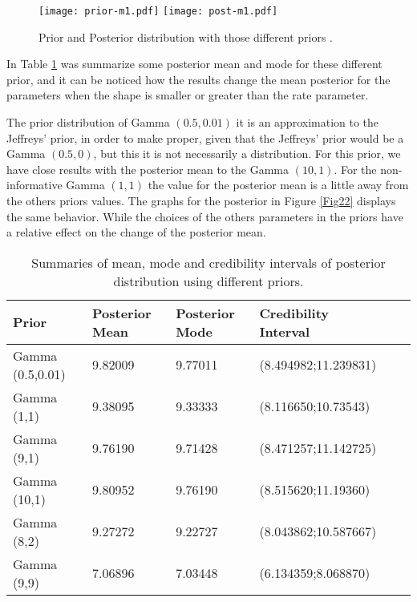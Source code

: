 \documentclass[a4paper, 11pt]{article}
\begin{document}
\begin{figure}[H]
\centering
\texttt{[image: prior-m1.pdf]}
\texttt{[image: post-m1.pdf]}
\caption{Prior and Posterior distribution with those different priors .}
\label{Fig2}
\end{figure}

 In Table \ref{prior1} was summarize some posterior mean and mode for these different prior, and it can be noticed how the results change the mean posterior for the parameters when the shape is smaller or greater than the rate parameter. 

The prior distribution of Gamma $(0.5,0.01)$ it is an approximation to the Jeffreys' prior, in order to make proper, given that the Jeffreys' prior would be a Gamma $(0.5,0)$, but this it is not necessarily a distribution. For this prior, we have close results with the posterior mean to the Gamma $(10,1)$. For the non-informative Gamma $(1,1)$ the value for the posterior mean is a little away from the others priors values. The graphs for the posterior in Figure \ref{Fig22} displays the same behavior. While the choices of the others parameters in the priors have a relative effect on the change of the posterior mean.
 
\begin{table}[H]
\caption{Summaries of mean, mode and credibility intervals of posterior distribution using different priors.}\label{prior1}
\centering
\begin{tabular}{llllcc}
\hline
\mbox{Prior} & Posterior Mean & Posterior Mode & Credibility Interval \\
\hline
Gamma (0.5,0.01) & 9.82009 & 9.77011 & (8.494982;11.239831) \\

Gamma (1,1)      & 9.38095 & 9.33333 & (8.116650;10.73543)\\

Gamma (9,1) 	 & 9.76190 & 9.71428 & (8.471257;11.142725)\\

Gamma (10,1)	 & 9.80952 & 9.76190 & (8.515620;11.19360) \\

Gamma (8,2) 	 & 9.27272 & 9.22727 & (8.043862;10.587667)\\

Gamma (9,9)      & 7.06896 & 7.03448 & (6.134359;8.068870)\\
\hline
\end{tabular}
\end{table}
\end{document}
